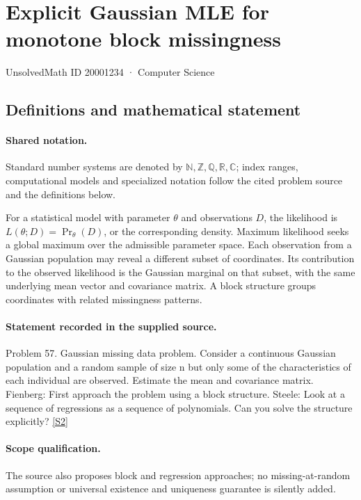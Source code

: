 \documentclass[11pt]{article}
\newcommand{\sref}[2]{\hyperlink{source:#1:#2}{[S#2]}}
\begin{document}
\setcounter{section}{20001233}
\section{Explicit Gaussian MLE for monotone block missingness}\label{20001234}
{\small\sffamily UnsolvedMath ID 20001234 · Computer Science}
\subsection{Definitions and mathematical statement}

\paragraph{Shared notation.}Standard number systems are denoted by $\mathbb N,\mathbb Z,\mathbb Q,\mathbb R,\mathbb C$; index ranges, computational models and specialized notation follow the cited problem source and the definitions below.


For a statistical model with parameter $\theta$ and observations $D$, the likelihood is $L(\theta;D)=\Pr_\theta(D)$, or the corresponding density. Maximum likelihood seeks a global maximum over the admissible parameter space. Each observation from a Gaussian population may reveal a different subset of coordinates. Its contribution to the observed likelihood is the Gaussian marginal on that subset, with the same underlying mean vector and covariance matrix. A block structure groups coordinates with related missingness patterns.
\paragraph{Statement recorded in the supplied source.}
Problem 57. Gaussian missing data problem. Consider a continuous Gaussian population and a random sample of size n but only some of the characteristics of each individual are observed. Estimate the mean and covariance matrix. Fienberg: First approach the problem using a block structure. Steele: Look at a sequence of regressions as a sequence of polynomials. Can you solve the structure explicitly? \sref{20001234}{2}
\paragraph{Scope qualification.}
The source also proposes block and regression approaches; no missing-at-random assumption or universal existence and uniqueness guarantee is silently added.
\end{document}
